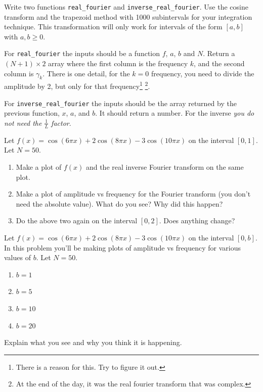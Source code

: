 \documentclass[11pt,letterpaper]{article}
\begin{document}
\begin{problem}
 Write two functions \texttt{real\_fourier} and \texttt{inverse\_real\_fourier}. Use the cosine
transform and the trapezoid method with 1000 subintervals for your integration technique. This transformation
will only work for intervals of the form $[a,b]$ with $a,b\ge 0$.


For \texttt{real\_fourier} the inputs should be a function $f$, $a$, $b$ and $N$. Return a
$(N+1)\times 2$ array where the first column is the frequency $k$, and the second column is $\gamma_k$.
There is one detail, for the $k=0$ frequency, you need to divide the amplitude by 2, but only for
that frequency\footnote{There is a reason for this. Try to figure it out.} \footnote{At the end of the
day, it was the real fourier transform that was complex.}. 

For \texttt{inverse\_real\_fourier} the inputs should be the array returned by the previous function,
$x$, $a$, and $b$. It should return a number. For the inverse \textit{you do not need the $\frac{1}{L}$
factor}.
\end{problem}



\begin{problem}
 Let $f(x) = \cos(6\pi x) + 2\cos(8\pi x) - 3\cos(10\pi x)$ on the interval $[0,1]$. Let $N=50$.
\begin{enumerate}
 \item Make a plot of $f(x)$ and the real inverse Fourier transform on the same plot.
 \item Make a plot of amplitude vs frequency for the Fourier transform (you don't need the absolute
value). What do you see? Why did this happen?
 \item Do the above two again on the interval $[0,2]$. Does anything change? 
\end{enumerate}
\end{problem}

\newpage

\begin{problem}
 Let $f(x) = \cos(6\pi x) + 2\cos(8\pi x) - 3\cos(10\pi x)$ on the interval $[0,b]$. In this 
problem you'll be making plots of amplitude vs frequency for various values of $b$. Let $N=50$.
\begin{enumerate}
 \item $b=1$
 \item $b=5$
 \item $b=10$
 \item $b=20$
\end{enumerate}
Explain what you see and why you think it is happening.
\end{problem}
\end{document}
